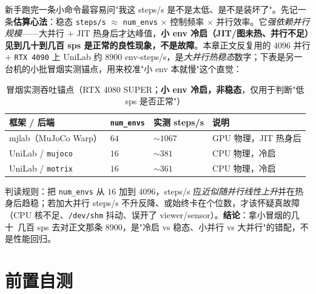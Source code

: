 \begin{note}
新手跑完一条小命令最容易问"我这 steps/s 是不是太低、是不是装坏了"。先记一条\textbf{估算心法}：稳态 \verb|steps/s| $\approx$ \verb|num_envs| $\times$ 控制频率 $\times$ 并行效率。它\emph{强依赖并行规模}——大并行 $+$ JIT 热身后才达峰值，\textbf{小 env 冷启（JIT/图未热、并行不足）见到几十到几百 sps 是正常的良性现象，不是故障}。本章正文反复用的 $4096$ 并行 $+$ \verb|RTX 4090| 上 UniLab 约 $8900$ env-steps/s，是\emph{大并行热稳态}数字；下表是另一台机的小批冒烟实测锚点，用来校准"小 env 本就慢"这个直觉：
\begin{table}[H]
\centering
\caption{冒烟实测吞吐锚点（RTX 4080 SUPER；\textbf{小 env 冷启，非稳态}，仅用于判断"低 sps 是否正常"）}
\label{tab:rlmc-train-sps-anchor}
\begin{tabular}{llll}
\hline
框架 / 后端 & \verb|num_envs| & 实测 steps/s & 说明 \\
\hline
mjlab（MuJoCo Warp） & $64$ & $\sim1067$ & GPU 物理，JIT 热身后 \\
UniLab / \verb|mujoco| & $16$ & $\sim381$ & CPU 物理，冷启 \\
UniLab / \verb|motrix| & $16$ & $\sim361$ & CPU 物理，冷启 \\
\hline
\end{tabular}
\end{table}
判读规则：把 \verb|num_envs| 从 $16$ 加到 $4096$，steps/s 应\emph{近似随并行线性上升}并在热身后趋稳；若加大并行 steps/s 不升反降、或始终卡在个位数，才该怀疑真故障（CPU 核不足、\verb|/dev/shm| 抖动、误开了 viewer/sensor）。\textbf{结论}：拿小冒烟的几十~几百 sps 去对正文那条 $8900$，是"冷启 vs 稳态、小并行 vs 大并行"的错配，不是性能回归。
\end{note}

\section*{前置自测}
\label{sec:rlmc-train-pretest}

